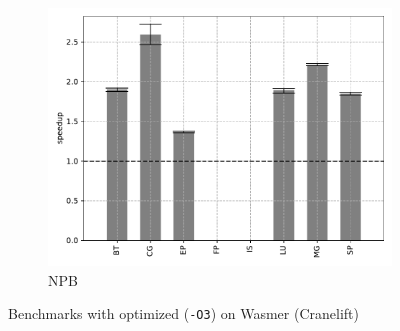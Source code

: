 \begin{figure}
\begin{subfigure}[t]{.45\textwidth}
        \includegraphics[width=\textwidth]
        {Images/6.1.RQ1/npb-wasmer-cranelift-opt.pdf}
        \caption{NPB}
    \end{subfigure}
    \caption{Benchmarks with optimized (\texttt{-O3}) on Wasmer (Cranelift)}
    \label{fig:rq1-wamer-cranelift-opt}
\end{figure}

